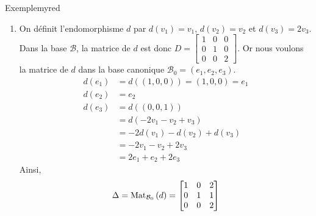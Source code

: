 \begin{omed}{Exemple}{myred}
\begin{enumerate}
\begin{itemize}
                \item On sait que $N_2$ est un EV de dimension $1$. Pour déterminer le noyau $\Ker(A - I_3) = \left\{v \in \mathbb{R}^3, \quad Av = 2v\right\}$, si $v = (x,y,z)$, on résout :
                \[ \left\{ \begin{array}{rcl}
                    x + y + z & = & 2x \\
                    y + z & = & 2y \\
                    2z & = & 2z
                \end{array} \right. \iff \et{x = 2z}{y = z} \]  
                Le SE $N_2$ est donc la droite vectorielle engendrée par le vecteur $v_3 = (2,1,1)$ : $N_2 = \mathbb{R}v_3$. 
                \item La famille $\mathcal{B} = (v_1, v_2, v_3)$ est une base de $\mathbb{R}^3$ : 
                \[ \mathbb{R}^3 = \mathbb{R} v_1 \oplus \mathbb{R} v_2 \oplus \mathbb{R} v_3 \]   
            \end{itemize}
            \item On définit l’endomorphisme $d$ par $d(v_1) = v_1$, $d(v_2) = v_2$ et $d(v_3) = 2 v_3$. Dans la base $\mathcal{B}$, la matrice de $d$ est donc $D = \begin{bmatrix}
                1 & 0 & 0 \\
                0 & 1 & 0 \\
                0 & 0 & 2 
            \end{bmatrix}$. Or nous voulons la matrice de $d$ dans la base canonique $\mathcal{B}_0 = (e_1, e_2, e_3)$. 
            \begin{align*}
                d(e_1) &= d((1,0,0)) = (1,0,0) = e_1 \\
                d(e_2) &= e_2 \\
                d(e_3) &= d((0,0,1)) \\
                &= d(-2v_1 - v_2 + v_3) \\
                &= -2 d(v_1) - d(v_2) + d(v_3) \\
                &= -2v_1 - v_2 + 2 v_3 \\
                &= 2e_1 + e_2 + 2e_3
            \end{align*}
            Ainsi, 
            \[ \Delta = \text{Mat}_{\mathcal{B}_0}\left(d\right) = \begin{bmatrix}
                1 & 0 & 2 \\
                0 & 1 & 1 \\
                0 & 0 & 2
            \end{bmatrix} \]   

\end{enumerate}
\end{omed}
